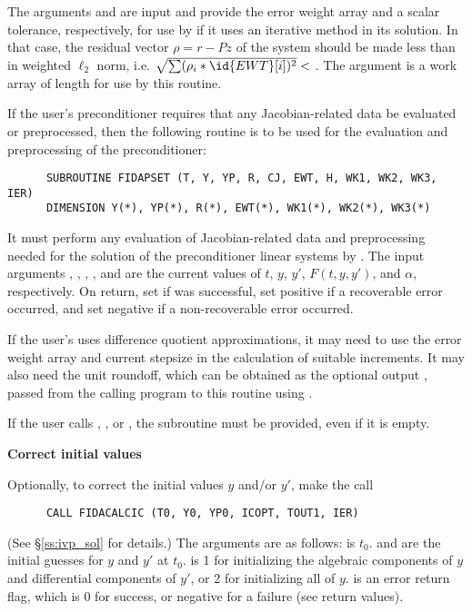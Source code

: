 \begin{Steps}
  The arguments  and  are input and provide the error weight
  array and a scalar tolerance, respectively, for use by  if it uses
  an iterative method in its solution.  In that case, the residual vector
  $\rho = r - Pz$ of the system should be made less than  in weighted
  $\ell_2$ norm, i.e. $\sqrt{\sum(\rho_i * \id{EWT}[i])^2} < $ .
  The argument  is a work array of length  for use by this
  routine.

  If the user's preconditioner requires that any Jacobian-related data be evaluated
  or preprocessed, then the following routine is to be used for the evaluation and 
  preprocessing of the preconditioner:
\begin{verbatim}
      SUBROUTINE FIDAPSET (T, Y, YP, R, CJ, EWT, H, WK1, WK2, WK3, IER)
      DIMENSION Y(*), YP(*), R(*), EWT(*), WK1(*), WK2(*), WK3(*) 
\end{verbatim}
  It must perform any evaluation of Jacobian-related data and preprocessing needed
  for the solution of the preconditioner linear systems by .
  The input arguments , , , , and  are the
  current values of $t$, $y$, $y'$, $F(t,y,y')$, and $\alpha$, respectively.
  On return, set  if  was successful, set 
  positive if a recoverable error occurred, and set  negative if a 
  non-recoverable error occurred.

  If the user's  uses difference quotient approximations, it
  may need to use the error weight array  and current stepsize 
  in the calculation of suitable increments.  It may also need the unit
  roundoff, which can be obtained as the optional output ,
  passed from the calling program to this routine using .

  {\warn} If the user calls , , or
  , the subroutine  must be provided,
  even if it is empty.

\item {\bf Correct initial values}

  Optionally, to correct the initial values $y$ and/or $y'$, make the call
\begin{verbatim}
      CALL FIDACALCIC (T0, Y0, YP0, ICOPT, TOUT1, IER)
\end{verbatim}
  (See \S\ref{ss:ivp_sol} for details.)  The arguments are as follows:
   is $t_0$.  and  are the initial guesses for $y$
  and $y'$ at $t_0$.
   is 1 for initializing the algebraic components of $y$ and
  differential components of $y'$, or 2 for initializing all of $y$.
   is an error return flag, which is 0 for success, or negative
  for a failure (see  return values).


\end{Steps}
